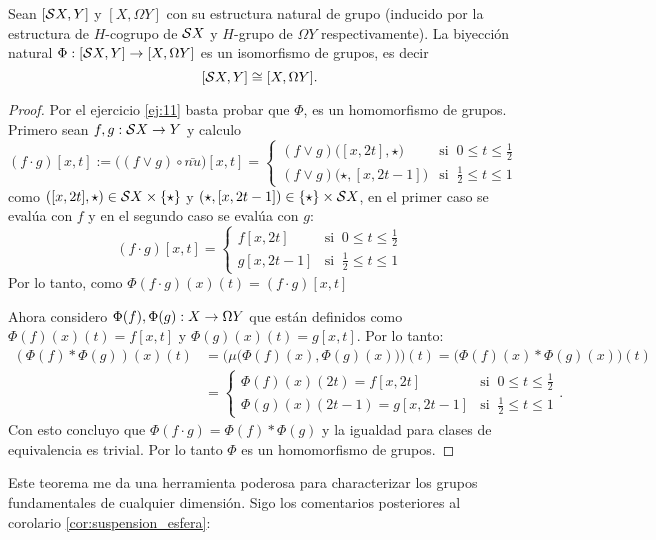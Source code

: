 \documentclass[../../topologia_algebraica]{subfiles}
\begin{document}
\begin{thm}
  Sean $[\mathcal{S} X,Y]$ y $[X,\Omega Y]$ con su estructura natural de grupo (inducido por la estructura
  de $H$-cogrupo de $\mathcal{S} X$ y $H$-grupo de $\Omega Y$ respectivamente). La biyecci\'on natural
  $\Phi:[\mathcal{S} X,Y]\rightarrow[X,\Omega Y]$ es un isomorfismo de grupos, es decir
  \[
    [\mathcal{S} X,Y]\cong[X,\Omega Y].
  \]
\end{thm}
\begin{proof}
  Por el ejercicio \ref{ej:11} basta probar que $\Phi$, es un homomorfismo de grupos. Primero sean
  $f,g:\mathcal{S} X\rightarrow Y$ y calculo
  \[
    (f\cdot g)[x,t]:=\big( (f\vee g)\circ\bar{nu}  \big)[x,t] =
    \begin{cases}
      (f\vee g)\big([x,2t],\star \big) & \text{si}\;\; 0\leq t\leq\frac{1}{2} \\
      (f\vee g)\big(\star,[x,2t-1] \big) & \text{si}\;\; \frac{1}{2}\leq t\leq 1
    \end{cases}
  \]
  como $([x,2t],\star)\in\mathcal{S} X\times\{\star\}$ y $(\star,[x,2t-1])\in\{\star\}\times\mathcal{S} X$, en
  el primer caso se eval\'ua con $f$ y en el segundo caso se eval\'ua con $g$:
  \[
    (f\cdot g)[x,t]=
    \begin{cases}
      f[x,2t]& \text{si}\;\; 0\leq t\leq\frac{1}{2} \\
      g[x,2t-1] & \text{si}\;\; \frac{1}{2}\leq t\leq 1
    \end{cases}
  \]
  Por lo tanto, como $\Phi(f\cdot g)(x)(t)=(f\cdot g)[x,t]$

  Ahora considero $\Phi(f),\Phi(g):X\rightarrow\Omega Y$ que est\'an definidos como $\Phi(f)(x)(t)=f[x,t]$
  y $\Phi(g)(x)(t)=g[x,t]$. Por lo tanto:
  \begin{align*}
    (\Phi(f)*\Phi(g))(x)(t) & =
    \Big(\mu\big( \Phi(f)(x),\Phi(g)(x)  \big)\Big)(t)=\big( \Phi(f)(x)*\Phi(g)(x)  \big)(t) \\ &=
    \begin{cases}
      \Phi(f)(x)(2t)=f[x,2t] & \text{si}\;\; 0\leq t\leq\frac{1}{2} \\
      \Phi(g)(x)(2t-1)=g[x,2t-1] & \text{si}\;\; \frac{1}{2}\leq t\leq 1   
    \end{cases}.
  \end{align*}
  Con esto concluyo que $\Phi(f\cdot g)=\Phi(f)*\Phi(g)$ y la igualdad para clases de equivalencia
  es trivial. Por lo tanto $\Phi$ es un homomorfismo de grupos.
\end{proof}

Este teorema me da una herramienta poderosa para characterizar los grupos fundamentales de cualquier
dimensi\'on. Sigo los comentarios posteriores al corolario \ref{cor:suspension_esfera}:
\end{document}
